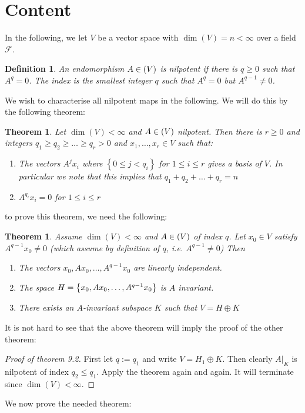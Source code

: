 \documentclass[10pt,twoside,openany,final]{memoir}
\theoremstyle{break}
\newtheorem{theorem}[section]{Theorem}
\newtheorem{definition}[section]{Definition}
\theoremstyle{Break}
\let\End\relax
\DeclareMathOperator{\End}{End}
\newcommand{\F}{\mathcal{F}}
\let\Span\relax
\DeclareMathOperator{\Span}{Span}
\begin{document}
\section*{Content}
In the following, we let $V$ be a vector space with $\dim(V)=n < \infty$ over a field $\F$.
\begin{definition}
	An endomorphism $A \in \End(V)$ is nilpotent if there is $q \geq 0$ such that $A^q=0$. The index is the smallest integer $q$ such that $A^q=0$ but $A^{q-1}\neq 0$.
\end{definition}
We wish to characterise all nilpotent maps in the following. We will do this by the following theorem:
\begin{theorem}
	Let $\dim(V)<\infty$ and $A \in \End(V)$ nilpotent. Then there is $r \geq 0$ and integers $q_1 \geq q_2 \geq \dots \geq q_r >0$ and $x_1,\dots,x_r \in V$ such that:
	\begin{enumerate}
		\item The vectors $A^j x_i$ where $\left\{ 0 \leq j < q_i \right\}$ for $1 \leq i \leq r$ gives a basis of $V$. In particular we note that this implies that $q_1+q_2+\dots+q_r=n$
		\item $A^{q_i}x_i=0$ for $1 \leq i \leq r$
	\end{enumerate}
\end{theorem}
to prove this theorem, we need the following:
\begin{theorem}
	Assume $\dim(V)<\infty$ and $A \in \End(V)$ of index $q$. Let $x_0 \in V$ satisfy $A^{q-1}x_0\neq 0$ (which assume by definition of $q$, i.e. $A^{q-1}\neq 0$) Then
	\begin{enumerate}
		\item The vectors $x_0,Ax_0,\dots,A^{q-1}x_0$ are linearly independent.
		\item The space $H=\Span\left\{ x_0,Ax_0,\dots,A^{q-1}x_0 \right\}$ is $A$ invariant.
		\item There exists an $A$-invariant subspace $K$ such that $V=H \oplus K$
	\end{enumerate}
\end{theorem}
It is not hard to see that the above theorem will imply the proof of the other theorem:
\begin{proof}[Proof of theorem 9.2]
First let $q:=q_1$ and write $V=H_1\oplus K$. Then clearly $A\big|_K$ is nilpotent of index $q_2 \leq q_1$. Apply the theorem again and again. It will terminate since $\dim(V)<\infty$.
\end{proof}
We now prove the needed theorem:
\end{document}
